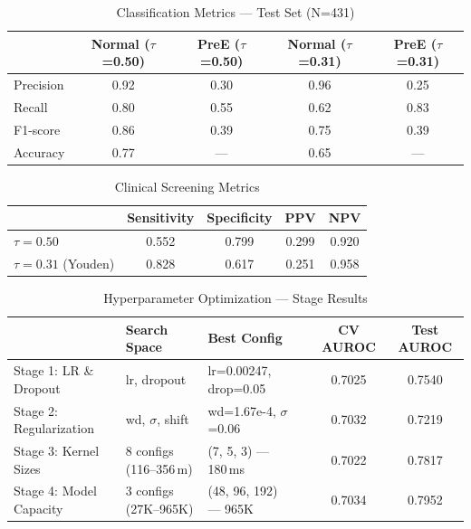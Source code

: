 \begin{table}[htbp]
\centering
\caption{Classification Metrics --- Test Set (N=431)}
\label{tab:classification_metrics}
\begin{tabular}{lcccc}
\toprule
 & \textbf{Normal ($\tau$=0.50)} & \textbf{PreE ($\tau$=0.50)} & \textbf{Normal ($\tau$=0.31)} & \textbf{PreE ($\tau$=0.31)} \\
\midrule
Precision  & 0.92 & 0.30 & 0.96 & 0.25 \\
Recall     & 0.80 & 0.55 & 0.62 & 0.83 \\
F1-score   & 0.86 & 0.39 & 0.75 & 0.39 \\
Accuracy   & 0.77 & ---  & 0.65 & ---  \\
\bottomrule
\end{tabular}
\end{table}

\begin{table}[htbp]
\centering
\caption{Clinical Screening Metrics}
\label{tab:clinical_screening}
\begin{tabular}{lcccc}
\toprule
 & \textbf{Sensitivity} & \textbf{Specificity} & \textbf{PPV} & \textbf{NPV} \\
\midrule
$\tau = 0.50$          & 0.552 & 0.799 & 0.299 & 0.920 \\
$\tau = 0.31$ (Youden) & 0.828 & 0.617 & 0.251 & 0.958 \\
\bottomrule
\end{tabular}
\end{table}

\begin{table}[htbp]
\centering
\caption{Hyperparameter Optimization --- Stage Results}
\label{tab:optuna_stages}
\begin{tabular}{llllcc}
\toprule
 & \textbf{Search Space} & \textbf{Best Config} & & \textbf{CV AUROC} & \textbf{Test AUROC} \\
\midrule
Stage 1: LR \& Dropout    & lr, dropout & lr=0.00247, drop=0.05 & & 0.7025 & 0.7540 \\
Stage 2: Regularization    & wd, $\sigma$, shift & wd=1.67e-4, $\sigma$=0.06 & & 0.7032 & 0.7219 \\
Stage 3: Kernel Sizes      & 8 configs (116--356\,m) & (7, 5, 3) --- 180\,ms & & 0.7022 & 0.7817 \\
Stage 4: Model Capacity    & 3 configs (27K--965K) & (48, 96, 192) --- 965K & & 0.7034 & 0.7952 \\
\bottomrule
\end{tabular}
\end{table}

